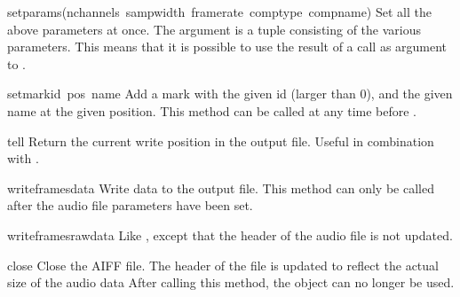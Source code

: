 \begin{funcdesc}{setparams}{(nchannels\, sampwidth\, framerate\, comptype\, compname)}
Set all the above parameters at once.  The argument is a tuple
consisting of the various parameters.  This means that it is possible
to use the result of a  call as argument to
.
\end{funcdesc}

\begin{funcdesc}{setmark}{id\, pos\, name}
Add a mark with the given id (larger than 0), and the given name at
the given position.  This method can be called at any time before
.
\end{funcdesc}

\begin{funcdesc}{tell}{}
Return the current write position in the output file.  Useful in
combination with .
\end{funcdesc}

\begin{funcdesc}{writeframes}{data}
Write data to the output file.  This method can only be called after
the audio file parameters have been set.
\end{funcdesc}

\begin{funcdesc}{writeframesraw}{data}
Like , except that the header of the audio file is
not updated.
\end{funcdesc}

\begin{funcdesc}{close}{}
Close the AIFF file.  The header of the file is updated to reflect the
actual size of the audio data After calling this method, the object
can no longer be used.
\end{funcdesc}
